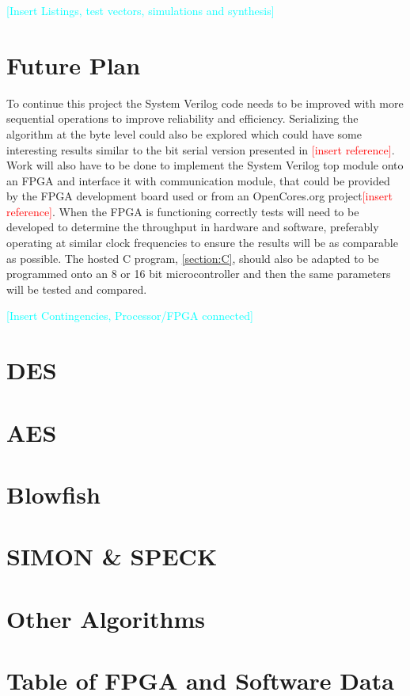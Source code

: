 \documentclass[12pt,twoside,a4paper]{report}
\begin{document}
    \textcolor{cyan}{[Insert Listings, test vectors, simulations and synthesis]}
    
    \chapter{Future Plan}
    To continue this project the System Verilog code needs to be improved with more sequential operations to improve reliability and efficiency. Serializing the algorithm at the byte level could also be explored which could have some interesting results similar to the bit serial version presented in \textcolor{red}{[insert reference]}. Work will also have to be done to implement the System Verilog top module onto an FPGA and interface it with communication module, that could be provided by the FPGA development board used or from an OpenCores.org project\textcolor{red}{[insert reference]}. When the FPGA is functioning correctly tests will need to be developed to determine the throughput in hardware and software, preferably operating at similar clock frequencies to ensure the results will be as comparable as possible. The hosted C program, \autoref{section:C}, should also be adapted to be programmed onto an 8 or 16 bit microcontroller and then the same parameters will be tested and compared.
    
    \textcolor{cyan}{[Insert Contingencies, Processor/FPGA connected]}
    
    \begin{thebibliography}{0}
    
    \end{thebibliography}
    
    \appendix
    
    \chapter{DES}
    
    \chapter{AES}

    \chapter{Blowfish}

    \chapter{SIMON \& SPECK}

    \chapter{Other Algorithms}

    \chapter{Table of FPGA and Software Data}
     
\end{document}

